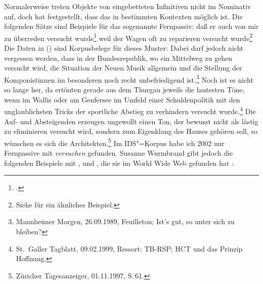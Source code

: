 Normalerweise treten Objekte von eingebetteten Infinitiven nicht im Nominativ auf,
doch  \citet[--176]{Hoehle78a} hat festgestellt, dass das in bestimmten Kontexten möglich ist.
Die folgenden Sätze sind Beispiele für das sogenannte Fernpassiv:
\eal
\ex{}
daß er auch von mir zu überreden versucht wurde\footnote{
        .%
}
\ex\label{bsp-zu-reparieren-versucht-wurde}
weil    der Wagen oft zu reparieren versucht wurde\footnote{
  Siehe  für ein ähnliches Beispiel.
}
\zl
Die Daten in () sind Korpusbelege für dieses Muster:
\eal
\ex Dabei darf jedoch nicht vergessen werden, dass in der Bundesrepublik, wo ein Mittelweg zu gehen versucht wird, 
die Situation der Neuen Musik allgemein und die Stellung der Komponistinnen im besonderen noch recht unbefriedigend ist.\footnote{
Mannheimer Morgen, 26.09.1989, Feuilleton; Ist's gut, so unter sich zu bleiben?
}
\ex Noch ist es nicht so lange her, da ertönten gerade aus dem Thurgau jeweils die lautesten Töne, 
    wenn im Wallis oder am Genfersee im Umfeld einer Schuldenpolitik mit den unglaublichsten Tricks 
    der sportliche Abstieg zu verhindern versucht wurde.\footnote{
St.\ Galler Tagblatt, 09.02.1999, Ressort: TB-RSP; HCT und das Prinzip Hoffnung.%
}
\ex Die Auf- und Absteigenden erzeugen ungewollt einen Ton,
        der bewusst nicht als lästig zu eliminieren versucht wird, 
    sondern zum Eigenklang des Hauses gehören soll, so wünschen es sich die Architekten.\footnote{
Züricher Tagesanzeiger, 01.11.1997, S.\,61.%
}
\zl
Im IDS"=Korpus habe ich 2002 nur Fernpassive mit \emph{versuchen} gefunden. Susanne
Wurmbrand gibt jedoch die folgenden Beispiele mit ,  und ,
die sie im World Wide Web gefunden hat \citep{Wurmbrand2003a}:
